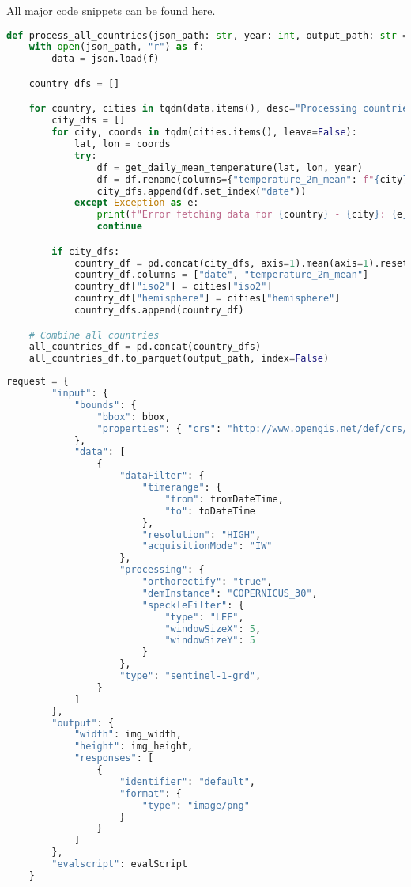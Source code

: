 All major code snippets can be found here.

\begin{lstlisting}[language=Python, caption={Method to retrieve historical temperature data}]
    def process_all_countries(json_path: str, year: int, output_path: str = "country_daily_avg.parquet"):
    with open(json_path, "r") as f:
        data = json.load(f)

    country_dfs = []

    for country, cities in tqdm(data.items(), desc="Processing countries"):
        city_dfs = []
        for city, coords in tqdm(cities.items(), leave=False):
            lat, lon = coords
            try:
                df = get_daily_mean_temperature(lat, lon, year)
                df = df.rename(columns={"temperature_2m_mean": f"{city}"})
                city_dfs.append(df.set_index("date"))
            except Exception as e:
                print(f"Error fetching data for {country} - {city}: {e}")
                continue

        if city_dfs:
            country_df = pd.concat(city_dfs, axis=1).mean(axis=1).reset_index()
            country_df.columns = ["date", "temperature_2m_mean"]
            country_df["iso2"] = cities["iso2"]
            country_df["hemisphere"] = cities["hemisphere"]
            country_dfs.append(country_df)

    # Combine all countries
    all_countries_df = pd.concat(country_dfs)
    all_countries_df.to_parquet(output_path, index=False)    
\end{lstlisting}\label{code:season}

\begin{lstlisting}[language=Python, caption={Request body for sentinel 1 images}]
    request = {
        "input": {
            "bounds": {
                "bbox": bbox,
                "properties": { "crs": "http://www.opengis.net/def/crs/EPSG/0/4326" }
            },
            "data": [
                {
                    "dataFilter": {
                        "timerange": {
                            "from": fromDateTime,
                            "to": toDateTime
                        },
                        "resolution": "HIGH",
                        "acquisitionMode": "IW"
                    },
                    "processing": {
                        "orthorectify": "true",
                        "demInstance": "COPERNICUS_30",
                        "speckleFilter": {
                            "type": "LEE",
                            "windowSizeX": 5,
                            "windowSizeY": 5
                        }
                    },
                    "type": "sentinel-1-grd",
                }
            ]
        },
        "output": {
            "width": img_width,
            "height": img_height,
            "responses": [
                {
                    "identifier": "default",
                    "format": {
                        "type": "image/png"
                    }
                }
            ]
        },
        "evalscript": evalScript
    }
\end{lstlisting}\label{code:sen1req}